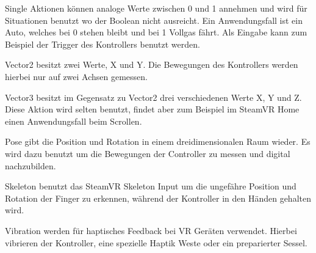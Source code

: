 Single Aktionen können analoge Werte zwischen 0 und 1 annehmen und wird für Situationen benutzt wo der Boolean nicht ausreicht.
Ein Anwendungsfall ist ein Auto, welches bei 0 stehen bleibt und bei 1 Vollgas fährt.
Als Eingabe kann zum Beispiel der Trigger des Kontrollers benutzt werden.

Vector2 besitzt zwei Werte, X und Y.
Die Bewegungen des Kontrollers werden hierbei nur auf zwei Achsen gemessen.

Vector3 besitzt im Gegensatz zu Vector2 drei verschiedenen Werte X, Y und Z.
Diese Aktion wird selten benutzt, findet aber zum Beispiel im SteamVR Home einen Anwendungsfall beim Scrollen.

Pose gibt die Position und Rotation in einem dreidimensionalen Raum wieder.
Es wird dazu benutzt um die Bewegungen der Controller zu messen und digital nachzubilden.

Skeleton benutzt das SteamVR Skeleton Input um die ungefähre Position und Rotation der Finger zu erkennen, während der Kontroller in den Händen gehalten wird.

Vibration werden für haptisches Feedback bei VR Geräten verwendet.
Hierbei vibrieren der Kontroller, eine spezielle Haptik Weste oder ein preparierter Sessel.
~\cite{SteamVR_Input_2022}

